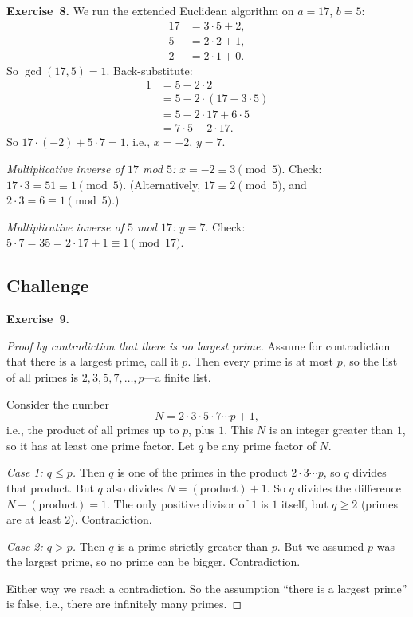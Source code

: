 \documentclass[11pt]{article}
\begin{document}
\medskip
\textbf{Exercise~8.}
We run the extended Euclidean algorithm on $a = 17$, $b = 5$:
\begin{align*}
  17 &= 3 \cdot 5 + 2, \\
  5 &= 2 \cdot 2 + 1, \\
  2 &= 2 \cdot 1 + 0.
\end{align*}
So $\gcd(17, 5) = 1$. Back-substitute:
\begin{align*}
  1 &= 5 - 2 \cdot 2 \\
    &= 5 - 2 \cdot (17 - 3 \cdot 5) \\
    &= 5 - 2 \cdot 17 + 6 \cdot 5 \\
    &= 7 \cdot 5 - 2 \cdot 17.
\end{align*}
So $17 \cdot (-2) + 5 \cdot 7 = 1$, i.e., $x = -2$, $y = 7$.

\emph{Multiplicative inverse of $17$ mod $5$:} $x = -2 \equiv 3 \pmod 5$. Check: $17 \cdot 3 = 51 \equiv 1 \pmod 5$. \checkmark (Alternatively, $17 \equiv 2 \pmod 5$, and $2 \cdot 3 = 6 \equiv 1 \pmod 5$.)

\emph{Multiplicative inverse of $5$ mod $17$:} $y = 7$. Check: $5 \cdot 7 = 35 = 2 \cdot 17 + 1 \equiv 1 \pmod{17}$. \checkmark

\subsection*{Challenge}

\textbf{Exercise~9.}
\begin{proof}[Proof by contradiction that there is no largest prime]
Assume for contradiction that there is a largest prime, call it $p$. Then every prime is at most $p$, so the list of all primes is $2, 3, 5, 7, \ldots, p$---a finite list.

Consider the number
\[
  N = 2 \cdot 3 \cdot 5 \cdot 7 \cdots p + 1,
\]
i.e., the product of all primes up to $p$, plus $1$. This $N$ is an integer greater than $1$, so it has at least one prime factor. Let $q$ be any prime factor of $N$.

\emph{Case 1: $q \leq p$.} Then $q$ is one of the primes in the product $2 \cdot 3 \cdots p$, so $q$ divides that product. But $q$ also divides $N = (\text{product}) + 1$. So $q$ divides the difference $N - (\text{product}) = 1$. The only positive divisor of $1$ is $1$ itself, but $q \geq 2$ (primes are at least $2$). Contradiction.

\emph{Case 2: $q > p$.} Then $q$ is a prime strictly greater than $p$. But we assumed $p$ was the largest prime, so no prime can be bigger. Contradiction.

Either way we reach a contradiction. So the assumption ``there is a largest prime'' is false, i.e., there are infinitely many primes.
\end{proof}
\end{document}
